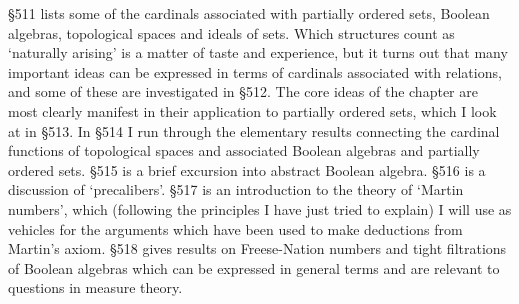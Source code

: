 \S511 lists some of the cardinals associated with partially ordered 
sets, Boolean algebras, topological spaces and ideals of sets.   Which 
structures count as `naturally arising' is a matter of taste and 
experience, but it turns out that many important ideas can be expressed 
in terms of cardinals associated with relations, and some of these are 
investigated in \S512.   The core ideas of the chapter are most clearly  
manifest in their application to partially ordered sets,  
which I look at in \S513.   In \S514 I run through the elementary results 
connecting the cardinal functions of topological spaces and associated 
Boolean algebras and partially ordered sets.   \S515 is a brief 
excursion into abstract Boolean algebra. 
\S516 is a discussion of `precalibers'.   \S517 is an introduction to 
the theory of `Martin numbers', which (following the principles I have 
just tried to explain) I will use as vehicles for the arguments which 
have been used to make deductions from Martin's axiom.    
\S518 gives results on Freese-Nation numbers and tight filtrations of  
Boolean algebras which can be expressed in general terms  
and are relevant to questions in measure theory. 
      
\discrpage 
      
